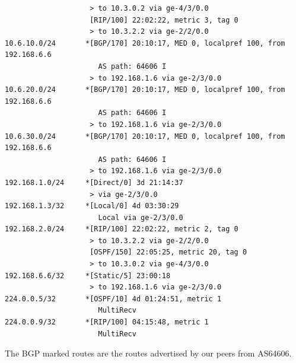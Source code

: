 \documentclass[10pt,a4paper]{article}
\begin{document}
\begin{verbatim}
                    > to 10.3.0.2 via ge-4/3/0.0
                    [RIP/100] 22:02:22, metric 3, tag 0
                    > to 10.3.2.2 via ge-2/2/0.0
10.6.10.0/24       *[BGP/170] 20:10:17, MED 0, localpref 100, from 192.168.6.6
                      AS path: 64606 I
                    > to 192.168.1.6 via ge-2/3/0.0
10.6.20.0/24       *[BGP/170] 20:10:17, MED 0, localpref 100, from 192.168.6.6
                      AS path: 64606 I
                    > to 192.168.1.6 via ge-2/3/0.0
10.6.30.0/24       *[BGP/170] 20:10:17, MED 0, localpref 100, from 192.168.6.6
                      AS path: 64606 I
                    > to 192.168.1.6 via ge-2/3/0.0
192.168.1.0/24     *[Direct/0] 3d 21:14:37
                    > via ge-2/3/0.0
192.168.1.3/32     *[Local/0] 4d 03:30:29
                      Local via ge-2/3/0.0
192.168.2.0/24     *[RIP/100] 22:02:22, metric 2, tag 0
                    > to 10.3.2.2 via ge-2/2/0.0
                    [OSPF/150] 22:05:25, metric 20, tag 0
                    > to 10.3.0.2 via ge-4/3/0.0
192.168.6.6/32     *[Static/5] 23:00:18
                    > to 192.168.1.6 via ge-2/3/0.0
224.0.0.5/32       *[OSPF/10] 4d 01:24:51, metric 1
                      MultiRecv
224.0.0.9/32       *[RIP/100] 04:15:48, metric 1
                      MultiRecv

\end{verbatim}

The BGP marked routes are the routes advertised by our peers from AS64606.
\end{document}
